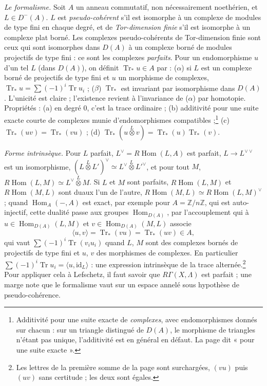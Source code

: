 \documentclass[11pt,a4paper]{article}
\begin{document}
\emph{Le formalisme.} Soit $A$ un anneau commutatif, non nécessairement
noethérien, et $L \in D^{-}(A)$. $L$ est \emph{pseudo-cohérent} s'il est
isomorphe à un complexe de modules de type fini en chaque degré, et de
\emph{Tor-dimension finie} s'il est isomorphe à un complexe plat borné. Les
complexes pseudo-cohérents de Tor-dimension finie sont ceux qui sont isomorphes
dans $D(A)$ à un complexe borné de modules projectifs de type fini : ce sont les
complexes \emph{parfaits}. Pour un endomorphisme $u$ d'un tel $L$ (dans $D(A)$),
on définit $\operatorname{Tr}_{*}u \in A$ par : ($\alpha$) si $L$ est un
complexe borné de projectifs de type fini et $u$ un morphisme de complexes,
$\operatorname{Tr}_{*}u = \sum(-1)^{i}\operatorname{Tr}u_{i}$ ; ($\beta$)
$\operatorname{Tr}_{*}$ est invariant par isomorphisme dans $D(A)$. L'unicité
est claire ; l'existence revient à l'invariance de ($\alpha$) par homotopie.
Propriétés : (a) en degré $0$, c'est la trace ordinaire ; (b) additivité pour
une suite exacte courte de complexes munie d'endomorphismes
compatibles ;\footnote{Additivité pour une suite exacte de \emph{complexes},
avec endomorphismes donnés sur chacun : sur un triangle distingué de $D(A)$, le
morphisme de triangles n'étant pas unique, l'additivité est en général en
défaut. La page dit « pour une suite exacte ».} (c) $\operatorname{Tr}_{*}(uv)
= \operatorname{Tr}_{*}(vu)$ ; (d) $\operatorname{Tr}_{*}(u
\overset{L}{\otimes} v) = \operatorname{Tr}_{*}(u)\operatorname{Tr}_{*}(v)$.

\emph{Forme intrinsèque.} Pour $L$ parfait, $L^{\vee} = R\operatorname{Hom}(L,
A)$ est parfait, $L \to L^{\vee\vee}$ est un isomorphisme, $(L
\overset{L}{\otimes} L')^{\vee} \simeq L^{\vee} \overset{L}{\otimes} L'^{\vee}$,
et pour tout $M$, $R\operatorname{Hom}(L, M) \simeq L^{\vee}
\overset{L}{\otimes} M$. Si $L$ et $M$ sont parfaits,
$R\operatorname{Hom}(L, M)$ et $R\operatorname{Hom}(M, L)$ sont duaux l'un de
l'autre, $R\operatorname{Hom}(M, L) \simeq R\operatorname{Hom}(L, M)^{\vee}$ ;
quand $\operatorname{Hom}_{A}(-, A)$ est exact, par exemple pour $A =
\mathbb{Z}/n\mathbb{Z}$, qui est auto-injectif, cette dualité passe aux groupes
$\operatorname{Hom}_{D(A)}$, par l'accouplement qui à $u \in \operatorname{Hom}_{D(A)}(L, M)$ et $v
\in \operatorname{Hom}_{D(A)}(M, L)$ associe
\[
  \langle u, v \rangle = \operatorname{Tr}_{*}(vu) = \operatorname{Tr}_{*}(uv)
  \in A,
\]
qui vaut $\sum(-1)^{i}\operatorname{Tr}(v_{i}u_{i})$ quand $L$, $M$ sont des
complexes bornés de projectifs de type fini et $u$, $v$ des morphismes de
complexes. En particulier $\sum(-1)^{i}\operatorname{Tr}u_{i} = \langle u,
\mathrm{id}_{L}\rangle$ : une expression intrinsèque de la trace
alternée.\footnote{Les lettres de la première somme de la page sont surchargées,
$(vu)$ puis $(uv)$ sans certitude ; les deux sont égales.} Pour appliquer cela à
Lefschetz, il faut savoir que $R\Gamma(X, \Lambda)$ est parfait ; une marge
note que le formalisme vaut sur un espace annelé sous hypothèse de
pseudo-cohérence.
\end{document}
